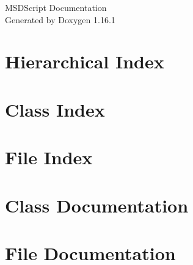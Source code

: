 \documentclass[twoside]{book}
\newcommand{\+}{\discretionary{\mbox{\scriptsize$\hookleftarrow$}}{}{}}
\newcommand{\clearemptydoublepage}{%
    \newpage{\pagestyle{empty}\cleardoublepage}%
  }
\begin{document}
  \raggedbottom
    \hypersetup{pageanchor=false,
                bookmarksnumbered=true,
                pdfencoding=unicode
               }
  \begin{titlepage}
  \vspace*{7cm}
  \begin{center}%
  {\Large MSDScript Documentation}\\
  \vspace*{1cm}
  {\large Generated by Doxygen 1.16.1}\\
  \end{center}
  \end{titlepage}
  \clearemptydoublepage
  \tableofcontents
  \clearemptydoublepage
  \hypersetup{pageanchor=true}

\chapter{Hierarchical Index}

\chapter{Class Index}

\chapter{File Index}

\chapter{Class Documentation}





\chapter{File Documentation}




  \backmatter
  \newpage
  \clearemptydoublepage
  \printindex
\end{document}
